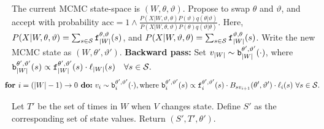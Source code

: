 \begin{algorithm}
\begin{algorithmic}[1]
    \State The current MCMC state-space is $(W,\theta,\vartheta)$. 
    Propose to swap $\theta$ and $\vartheta$, %
     and accept with probability 
     $
     \text{acc} 
        =  1 \wedge \frac{P(X| W,\vartheta,\theta)P(\vartheta)q(\theta|\vartheta)}
        {P(X| W,\theta, \vartheta)P(\theta) q(\vartheta|\theta)}.
        $
        Here, $P(X|W,\theta,\vartheta) = \sum_{s \in {\mathcal S}} \mathtt{f}^{\theta,\vartheta}_{|W|}(s)$, and $P(X|W,\vartheta,\theta) = \sum_{s \in {\mathcal S}} \mathtt{f}^{\vartheta,\theta}_{|W|}(s)$.
    Write the new MCMC state as $(W,\theta',\vartheta')$.
    \State \textbf{Backward pass:}
    Set $v_{|W|} \sim \mathtt{b}^{\theta',\vartheta'}_{|W|}(\cdot)$, where $\mathtt{b}^{\theta',\vartheta'}_{|W|}(s) \propto \mathtt{f}^{\theta',\vartheta'}_{|W|}(s)\cdot\ell_{|W|}(s) \quad \forall s \in {\mathcal S}.$ 
    $$\hspace{-.15in} \textbf{for } i=(|W|-1)\rightarrow 0\textbf{ do:} \ v_i \sim \bck^{\theta',\vartheta'}_i(\cdot), \text{where } 
    \bck^{\theta',\vartheta'}_i(s) \propto \fwd^{\theta',\vartheta'}_i(s)\cdot B_{sv_{i+1}}(\theta',\vartheta') \cdot \ell_i(s)  \ \forall s \in \cS.$$
    
    \State Let $T'$ be the set of times in $W$ when $V$ changes state. Define $S'$ as the corresponding set of state values. Return $(S', T', \theta')$.
\end{algorithmic}
\end{algorithm}



